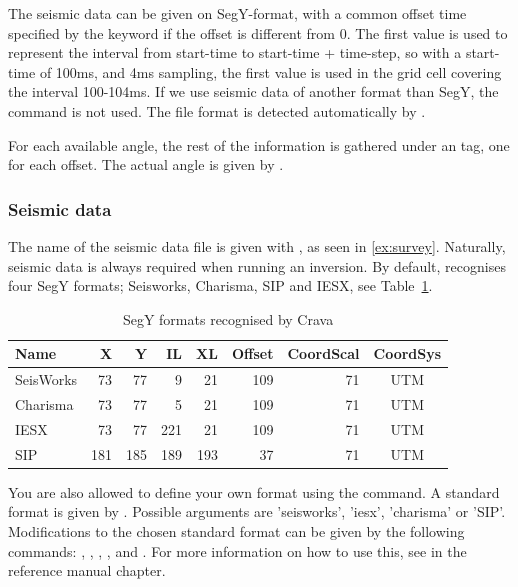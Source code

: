 The seismic data can be given on SegY-format, with a common offset time
specified by the keyword 
if the offset is different from 0. The first value is used to
represent the interval from start-time to start-time + time-step, so
with a start-time of 100ms, and 4ms sampling, the first value is used
in the grid cell covering the interval 100-104ms. If we use seismic
data of another format than SegY, the  command is
not used. The file format is detected automatically by \crava.

For each available angle, the rest of the information is gathered under an  tag, one for each offset. The actual angle is given by .

\subsubsection{Seismic data}
\label{sec:basicseis}
The name of the seismic data file is given with , as seen in \autoref{ex:survey}. Naturally, seismic data is always required when running an inversion.
By default, \crava recognises four SegY formats; Seisworks, Charisma, SIP and IESX, see Table~\ref{tab:segyformats}. 
\begin{table}[h]
\centering
\caption{SegY formats recognised by Crava}
\label{tab:segyformats}
\begin{tabular}{|l|r|r|r|r|r|r|c|}
\hline
Name & X & Y & IL & XL & Offset & CoordScal & CoordSys \\ \hline \hline
SeisWorks & 73 & 77 & 9 & 21 & 109 & 71 & UTM \\ \hline
Charisma & 73 & 77 & 5 & 21 & 109 & 71 & UTM \\ \hline
IESX & 73 & 77 & 221 & 21 & 109 & 71 & UTM \\ \hline
SIP & 181 & 185 & 189 & 193 & 37 & 71 & UTM  \\ \hline
\end{tabular}
\end{table}

You are also allowed to define your own format using the  command. A standard format is given by . Possible arguments are 'seisworks', 'iesx', 'charisma' or 'SIP'. Modifications to the chosen standard format can be given by the following commands: , , , ,  and . For more information on how to use this, see  in the reference manual chapter.
 
